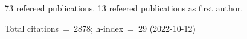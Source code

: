 73 refereed publications. 13 refeered publications as first author.

Total citations~=~2878; h-index~=~29 (2022-10-12)